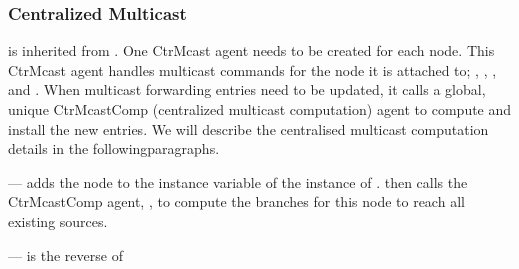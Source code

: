 \subsubsection{Centralized Multicast}
\begin{list}{}{}
\item
{} is inherited from .
One CtrMcast agent needs to be created for each node.
This CtrMcast agent handles multicast commands for the node it is
attached to;
\eg, , 
, and .
When multicast forwarding entries need to be updated, it calls a 
global, unique CtrMcastComp
(centralized multicast computation) agent to compute and install the new
entries.
We will describe the centralised multicast computation details
in the followingparagraphs.

--- 
 adds the node to the instance variable
 of the instance of .
then calls the CtrMcastComp agent, , to compute the branches
for this node to reach all existing sources.

---
 is the reverse of 


\end{list}
